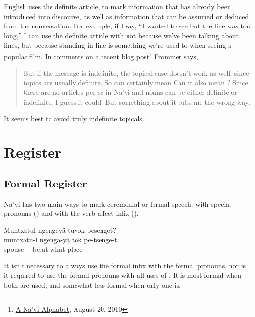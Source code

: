 English uses the definite article,  to mark information that
has already been introduced into discourse, as well as information
that can be assumed or deduced from the conversation.  For example, if
I say, ``I wanted to see  but the line was too long,'' I
can use the definite article with  not because we've been
talking about lines, but because standing in line is something we're
used to when seeing a popular film.  In comments on a recent blog
post\footnote{\href{https://naviteri.org/2010/08/20/}{A
Na'vi Alphabet}, August 20, 2010} Frommer says, 

\begin{quote}But if the message is indefinite, the topical case
doesn’t work as well, since topics are usually definite. So
 can certainly mean  Can it also mean ? Since there are no articles per se in Na’vi
and nouns can be either definite or indefinite, I guess it
could. But something about it rubs me the wrong way.
\end{quote}

\noindent It seems best to avoid truly indefinite topicals.


\section{Register}

\subsection{Formal Register} Na'vi has two main ways to mark
ceremonial or formal speech: with special pronouns
() and with the verb affect infix
 ().

\begin{interlin}
\glll Muntxatul ngengeyä tuyok pesenget? \\
   muntxatu-l ngenga-yä tok pe-tsenge-t \\
   spouse- - be.at what-place-\\
\Ipawl{}
\end{interlin}

\noindent It isn't necessary to always use the formal
infix  with the formal pronouns, nor is it required to use
the formal pronouns with all uses of .  It is most formal
when both are used, and somewhat less formal when only one is.

